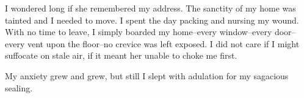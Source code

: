 \documentclass{article}
\begin{document}
I wondered long if she remembered my address.
The sanctity of my home was tainted and I needed to move.
I spent the day packing and nursing my wound.
With no time to leave, I simply boarded my home--every
window--every door--every vent upon the floor--no
crevice was left exposed.
I did not care if I might suffocate on stale air,
if it meant her unable to choke me first.


My anxiety grew and grew, but still I slept
with adulation for my sagacious sealing.




















\end{document}
